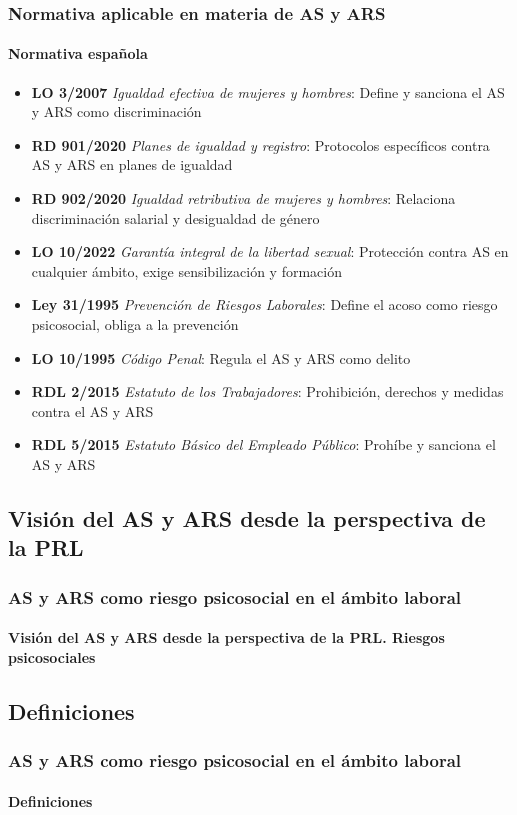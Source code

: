 \documentclass{beamer}
\begin{document}
    \begin{frame}
        \frametitle{Normativa aplicable en materia de AS y ARS}
        \framesubtitle{Normativa española}
        \begin{itemize}
            \item \textbf{LO 3/2007} \textit{Igualdad efectiva de mujeres y hombres}: Define y sanciona el AS y ARS como discriminación
            \item \textbf{RD 901/2020} \textit{Planes de igualdad y registro}: Protocolos específicos contra AS y ARS en planes de igualdad
            \item \textbf{RD 902/2020} \textit{Igualdad retributiva de mujeres y hombres}: Relaciona discriminación salarial y desigualdad de género
            \item \textbf{LO 10/2022} \textit{Garantía integral de la libertad sexual}: Protección contra AS en cualquier ámbito, exige sensibilización y formación
            \item \textbf{Ley 31/1995} \textit{Prevención de Riesgos Laborales}: Define el acoso como riesgo psicosocial, obliga a la prevención
            \item \textbf{LO 10/1995} \textit{Código Penal}: Regula el AS y ARS como delito
            \item \textbf{RDL 2/2015} \textit{Estatuto de los Trabajadores}: Prohibición, derechos y medidas contra el AS y ARS
            \item \textbf{RDL 5/2015} \textit{Estatuto Básico del Empleado Público}: Prohíbe y sanciona el AS y ARS
        \end{itemize}
    \end{frame}

    \subsection{Visión del AS y ARS desde la perspectiva de la PRL}

    \begin{frame}
		\frametitle{AS y ARS como riesgo psicosocial en el ámbito laboral}
        \framesubtitle{Visión del AS y ARS desde la perspectiva de la PRL. Riesgos psicosociales}
	\end{frame}

    \subsection{Definiciones}
    \begin{frame}
		\frametitle{AS y ARS como riesgo psicosocial en el ámbito laboral}
        \framesubtitle{Definiciones}
	\end{frame}
\end{document}
